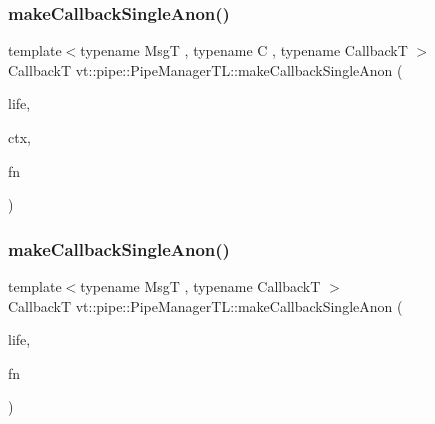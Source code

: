 \subsubsection{\texorpdfstring{make\+Callback\+Single\+Anon()}{makeCallbackSingleAnon()}\hspace{0.1cm}{\footnotesize\ttfamily [5/6]}}
{\footnotesize\ttfamily template$<$typename MsgT , typename C , typename CallbackT $>$ \\
CallbackT vt\+::pipe\+::\+Pipe\+Manager\+T\+L\+::make\+Callback\+Single\+Anon (\begin{DoxyParamCaption}\item[{\hyperlink{namespacevt_1_1pipe_acb42b284378c0fdac1d7c6335dc26f58}{Lifetime\+Enum}}]{life,  }\item[{C $\ast$}]{ctx,  }\item[{\hyperlink{structvt_1_1pipe_1_1_pipe_manager_base_a73fdf82ece0411b3dc644c99b763f7a9}{Func\+Msg\+Ctx\+Type}$<$ MsgT, C $>$}]{fn }\end{DoxyParamCaption})}

\mbox{\label{structvt_1_1pipe_1_1_pipe_manager_t_l_a1b3d31ba2e73d77ef2ed5c7f752d2eb9}} 
\subsubsection{\texorpdfstring{make\+Callback\+Single\+Anon()}{makeCallbackSingleAnon()}\hspace{0.1cm}{\footnotesize\ttfamily [6/6]}}
{\footnotesize\ttfamily template$<$typename MsgT , typename CallbackT $>$ \\
CallbackT vt\+::pipe\+::\+Pipe\+Manager\+T\+L\+::make\+Callback\+Single\+Anon (\begin{DoxyParamCaption}\item[{\hyperlink{namespacevt_1_1pipe_acb42b284378c0fdac1d7c6335dc26f58}{Lifetime\+Enum}}]{life,  }\item[{\hyperlink{structvt_1_1pipe_1_1_pipe_manager_base_aa54eee64ab32a27777a672d49eb861f4}{Func\+Msg\+Type}$<$ MsgT $>$}]{fn }\end{DoxyParamCaption})}

\mbox{\label{structvt_1_1pipe_1_1_pipe_manager_t_l_ae239877cc157e7f5c95aa96421b7e1bb}} 
